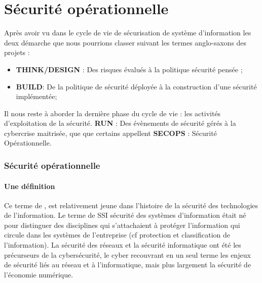 

\section{Sécurité opérationnelle}


Après avoir vu dans le cycle de vie de sécurisation de système d'information les deux démarche que nous pourrions classer suivant les termes anglo-saxons des projets :

\begin{itemize}
 \item \textbf{THINK/DESIGN} : Des risques évalués à la politique sécurité pensée ;
 \item \textbf{BUILD}: De la politique de sécurité déployée à la construction d’une sécurité implémentée;
\end{itemize}

Il nous reste à aborder la dernière phase du cycle de vie : les activités d'exploitation de la sécurité. \textbf{RUN} : Des évènements de sécurité gérés à la cybercrise maitrisée, que que certains appellent \textbf{SECOPS} : Sécurité Opérationnelle.

\begin{frame}
\frametitle<presentation>{Sécurité opérationnelle}
\framesubtitle<presentation>{Une définition}
 Ce terme de , est relativement jeune dans l’histoire de la sécurité des technologies de l’information. Le terme de SSI sécurité des systèmes d’information était né pour distinguer des disciplines qui s’attachaient à protéger l’information qui circule dans les systèmes de l’entreprise (cf protection et classification de l’information). La sécurité des réseaux et la sécurité informatique ont été les précurseurs de la cybersécurité, le cyber recouvrant en un seul terme les enjeux de sécurité liés au réseau et à l’informatique, mais plus largement la sécurité de l'économie numérique.
\end{frame}

